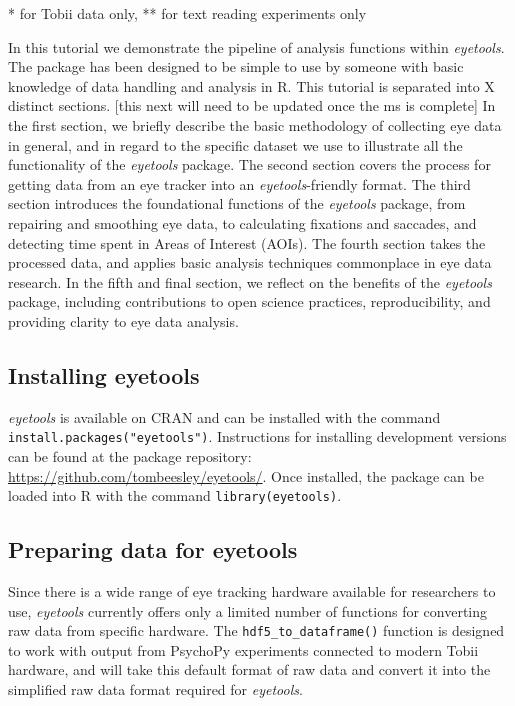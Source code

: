 \documentclass[
  man,
  floatsintext,
  longtable,
  nolmodern,
  notxfonts,
  notimes,
  colorlinks=true,linkcolor=blue,citecolor=blue,urlcolor=blue]{apa7}
\begin{document}
* for Tobii data only, ** for text reading experiments only

In this tutorial we demonstrate the pipeline of analysis functions
within \emph{eyetools}. The package has been designed to be simple to
use by someone with basic knowledge of data handling and analysis in R.
This tutorial is separated into X distinct sections. {[}this next will
need to be updated once the ms is complete{]} In the first section, we
briefly describe the basic methodology of collecting eye data in
general, and in regard to the specific dataset we use to illustrate all
the functionality of the \emph{eyetools} package. The second section
covers the process for getting data from an eye tracker into an
\emph{eyetools}-friendly format. The third section introduces the
foundational functions of the \emph{eyetools} package, from repairing
and smoothing eye data, to calculating fixations and saccades, and
detecting time spent in Areas of Interest (AOIs). The fourth section
takes the processed data, and applies basic analysis techniques
commonplace in eye data research. In the fifth and final section, we
reflect on the benefits of the \emph{eyetools} package, including
contributions to open science practices, reproducibility, and providing
clarity to eye data analysis.

\subsection{Installing eyetools}\label{installing-eyetools}

\emph{eyetools} is available on CRAN and can be installed with the
command \texttt{install.packages("eyetools")}. Instructions for
installing development versions can be found at the package repository:
\url{https://github.com/tombeesley/eyetools/}. Once installed, the
package can be loaded into R with the command
\texttt{library(eyetools)}.

\subsection{Preparing data for
eyetools}\label{preparing-data-for-eyetools}

Since there is a wide range of eye tracking hardware available for
researchers to use, \emph{eyetools} currently offers only a limited
number of functions for converting raw data from specific hardware. The
\texttt{hdf5\_to\_dataframe()} function is designed to work with output
from PsychoPy experiments connected to modern Tobii hardware, and will
take this default format of raw data and convert it into the simplified
raw data format required for \emph{eyetools}.
\end{document}
